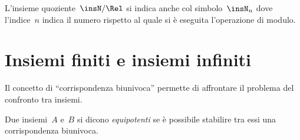 L'insieme quoziente~$\insN/\Rel$ si indica anche col simbolo~$\insN_{n}$ dove l'indice~$n$ indica il numero rispetto al quale si è
eseguita l'operazione di modulo.

\ovalbox{\risolvii \ref{ese:E.6}, \ref{ese:E.7}, \ref{ese:E.8}, \ref{ese:E.9}}

\section{Insiemi finiti e insiemi infiniti}\label{sect:insiemi_finiti_e_infiniti}

Il concetto di ``corrispondenza biunivoca'' permette di affrontare il problema del confronto tra insiemi.
\begin{definizione}
 Due insiemi~$A$ e~$B$ si dicono \emph{equipotenti} se è possibile stabilire tra essi una corrispondenza biunivoca.
\end{definizione}

